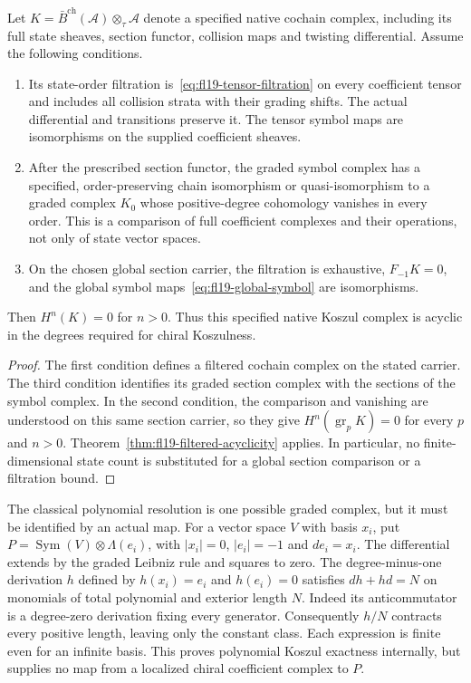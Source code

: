 \begin{theorem}
\label{thm:pbw-koszulness-criterion}
Let $K=\bar B^{\mathrm{ch}}(\mathcal A)\otimes_\tau\mathcal A$ denote a specified native cochain complex, including its full state sheaves, section functor, collision maps and twisting differential.
Assume the following conditions.
\begin{enumerate}
\item\label{item:pbw-flat} Its state-order filtration is~\eqref{eq:fl19-tensor-filtration} on every coefficient tensor and includes all collision strata with their grading shifts.
The actual differential and transitions preserve it.
The tensor symbol maps are isomorphisms on the supplied coefficient sheaves.
\item\label{item:pbw-classical-koszul} After the prescribed section functor, the graded symbol complex has a specified, order-preserving chain isomorphism or quasi-isomorphism to a graded complex $K_0$ whose positive-degree cohomology vanishes in every order.
This is a comparison of full coefficient complexes and their operations, not only of state vector spaces.
\item\label{item:pbw-bounded} On the chosen global section carrier, the filtration is exhaustive, $F_{-1}K=0$, and the global symbol maps~\eqref{eq:fl19-global-symbol} are isomorphisms.
\end{enumerate}
Then $H^n(K)=0$ for $n>0$.
Thus this specified native Koszul complex is acyclic in the degrees required for chiral Koszulness.
\end{theorem}
\begin{proof}
The first condition defines a filtered cochain complex on the stated carrier.
The third condition identifies its graded section complex with the sections of the symbol complex.
In the second condition, the comparison and vanishing are understood on this same section carrier, so they give
$H^n(\operatorname{gr}_pK)=0$ for every $p$ and $n>0$.
Theorem~\ref{thm:fl19-filtered-acyclicity} applies.
In particular, no finite-dimensional state count is substituted for a global section comparison or a filtration bound.
\end{proof}

The classical polynomial resolution is one possible graded complex, but it must be identified by an actual map.
For a vector space $V$ with basis $x_i$, put
$P=\operatorname{Sym}(V)\otimes\Lambda(e_i)$, with $|x_i|=0$, $|e_i|=-1$ and $d e_i=x_i$.
The differential extends by the graded Leibniz rule and squares to zero.
The degree-minus-one derivation $h$ defined by $h(x_i)=e_i$ and $h(e_i)=0$ satisfies
$dh+hd=N$ on monomials of total polynomial and exterior length $N$.
Indeed its anticommutator is a degree-zero derivation fixing every generator.
Consequently $h/N$ contracts every positive length, leaving only the constant class.
Each expression is finite even for an infinite basis.
This proves polynomial Koszul exactness internally, but supplies no map from a localized chiral coefficient complex to $P$.

